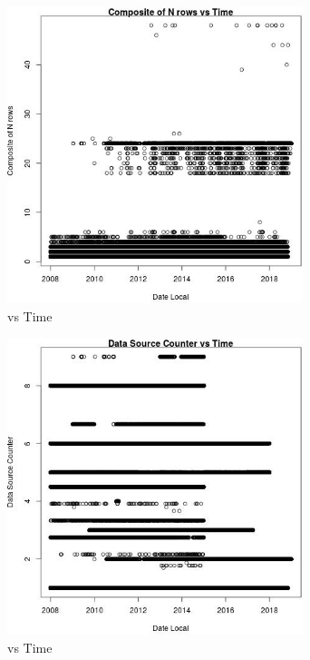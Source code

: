\begin{figure} 
\centering  
\includegraphics[width=0.77\textwidth]{Code_Outputs/Report_PM25_Step4_part_e_de_duplicated_aves_prioritize_24hr_obs_ML_input_Composite_of_N_rowsvDate_Local.jpg} 
\caption{\label{fig:Report_PM25_Step4_part_e_de_duplicated_aves_prioritize_24hr_obs_ML_inputComposite_of_N_rowsvDate_Local}vs Time} 
\end{figure} 
 

\begin{figure} 
\centering  
\includegraphics[width=0.77\textwidth]{Code_Outputs/Report_PM25_Step4_part_e_de_duplicated_aves_prioritize_24hr_obs_ML_input_Data_Source_CountervDate_Local.jpg} 
\caption{\label{fig:Report_PM25_Step4_part_e_de_duplicated_aves_prioritize_24hr_obs_ML_inputData_Source_CountervDate_Local}vs Time} 
\end{figure} 
 

